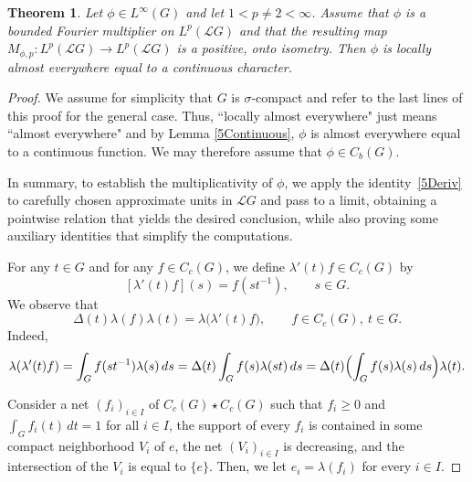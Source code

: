\documentclass[12pt]{amsart}
\newtheorem{theorem}{Theorem}[section]
\theoremstyle{remark}
\theoremstyle{definition}
\numberwithin{equation}{section}
\begin{document}
\begin{theorem}\label{5Positive} 
Let $\phi\in L^\infty(G)$ and let
$1<p\not=2<\infty$. Assume that $\phi$ is a bounded Fourier multiplier on  $L^p({\mathcal L}G)$
and that the resulting map
$M_{\phi,p}\colon L^p({\mathcal L}G)\to L^p({\mathcal L}G)$ is a positive, onto isometry.
Then $\phi$ is locally almost everywhere equal to a continuous 
character.
\end{theorem}





\begin{proof}
We assume for simplicity that $G$ is $\sigma$-compact and refer to the last lines 
of this proof for the general case.
Thus, ``locally almost everywhere" just means ``almost everywhere" and by 
Lemma \ref{5Continuous}, $\phi$ is almost everywhere equal to a continuous function. 
We may therefore assume that $\phi\in C_b(G)$.

In summary, to establish the multiplicativity of $\phi$, we apply the identity~\eqref{5Deriv} to carefully chosen approximate units in ${\mathcal L}G$ and pass to a   limit, obtaining a pointwise relation that yields the desired conclusion, while also proving some auxiliary identities that simplify the computations.

For any $t\in G$ and for any $f\in C_c(G)$, we define 
$\lambda'(t)f\in C_c(G)$ by
$$
[\lambda'(t)f](s)=f(st^{-1}),\qquad s\in G.
$$
We observe that 
\begin{equation}\label{5Modular}
\Delta(t)\lambda(f)\lambda(t) = \lambda\bigl(\lambda'(t)f\bigr),
\qquad f\in C_c(G),\ t\in G.
\end{equation}
Indeed, 
$$
\lambda(\lambda'(t)f) = \int_G f(st^{-1})\lambda(s)\, ds= \Delta(t) \int_G f(s)\lambda(st)\, ds
 = \Delta(t) \Bigl(\int_G f(s)\lambda(s)\, ds\Bigr)\lambda(t).
$$





Consider a net $(f_i)_{i\in I}$ of $C_c(G)\star C_c(G)$ such that $f_i\geq 0$ and $\int_G f_i(t)\, dt=1$
for all $i\in I$,  the support of every
$f_i$ is contained in some compact neighborhood
$V_i$ of $e$, the net $(V_i)_{i\in I}$ is decreasing, and the intersection of the $V_i$ is equal to $\{e\}$. 
Then, we let $e_i=\lambda(f_i)$ for every $i\in I$.



\end{proof}
\end{document}
